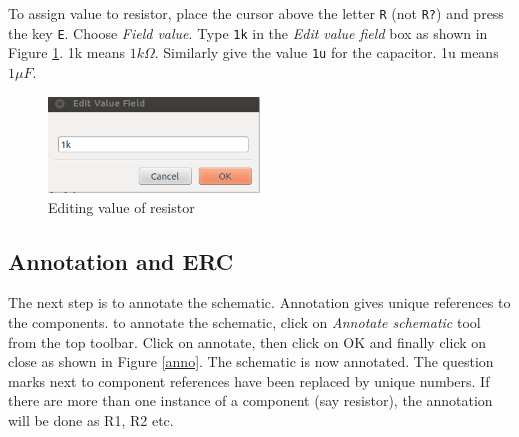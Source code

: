 To assign value to resistor, place the cursor above the letter {\tt R} (not {\tt R?}) and press the key {\tt E}. Choose \textit{Field value}. Type {\tt 1k} in the \textit{Edit value field} box as shown in Figure \ref{field}. 1k means $1k\Omega$. Similarly give the value {\tt 1u} for the capacitor. 1u means $1\mu F$. 
\begin{figure}
\centering
\includegraphics[width=0.5\textwidth]{figures/field}
\caption{Editing value of resistor}
\label{field}
\end{figure}
\subsection{Annotation and ERC}
\label{ann}
The next step is to annotate the schematic. Annotation gives unique references to the components. to annotate the schematic, click on \textit{Annotate schematic} tool from the top toolbar. Click on annotate, then click on OK and finally click on close as shown in Figure \ref{anno}. The schematic is now annotated. The question marks next to component references have been replaced by unique numbers. If there are more than one instance of a component (say resistor), the annotation will be done as R1, R2 etc.


